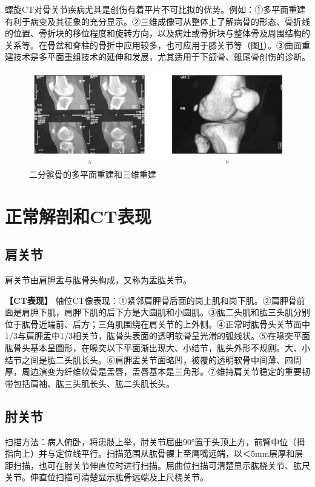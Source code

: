 螺旋CT对骨关节疾病尤其是创伤有着平片不可比拟的优势。例如：①多平面重建有利于病变及其征象的充分显示。②三维成像可从整体上了解病骨的形态、骨折线的位置、骨折块的移位程度和旋转方向，以及病灶或骨折块与整体骨及周围结构的关系等。在骨盆和脊柱的骨折中应用较多，也可应用于膝关节等（图\ref{fig22-1}）。③曲面重建技术是多平面重组技术的延伸和发展，尤其适用于下颌骨、骶尾骨创伤的诊断。

\begin{figure}[!htbp]
 \centering
 \includegraphics[width=.7\textwidth,height=\textheight,keepaspectratio]{./images/Image00417.jpg}
 \captionsetup{justification=centering}
 \caption{二分髌骨的多平面重建和三维重建}
 \label{fig22-1}
  \end{figure} 

\section{正常解剖和CT表现}

\subsection{肩关节}

肩关节由肩胛盂与肱骨头构成，又称为盂肱关节。

\textbf{【CT表现】}
轴位CT像表现：①紧邻肩胛骨后面的岗上肌和岗下肌。②肩胛骨前面是肩胛下肌，肩胛下肌的后下方是大圆肌和小圆肌。③肱二头肌和肱三头肌分别位于肱骨近端前、后方；三角肌围绕在肩关节的上外侧。④正常时肱骨头关节面中1/3与肩胛盂中1/3相关节，肱骨头表面的透明软骨呈光滑的弧线状。⑤在喙突平面肱骨头基本呈圆形，在喙突以下平面渐出现大、小结节，肱头外形不规则。大、小结节之间是肱二头肌长头。⑥肩胛盂关节面略凹，被覆的透明软骨中间薄、四周厚，周边演变为纤维软骨是盂唇，盂唇基本是三角形。⑦维持肩关节稳定的重要韧带包括肩袖、肱三头肌长头、肱二头肌长头。

\subsection{肘关节}

扫描方法：病人俯卧，将患肢上举，肘关节屈曲90°置于头顶上方，前臂中位（拇指向上）并与定位线平行。扫描范围从肱骨髁上至鹰嘴远端，以＜5mm层厚和层距扫描，也可在肘关节伸直位时进行扫描。屈曲位扫描可清楚显示肱桡关节、肱尺关节。伸直位扫描可清楚显示肱骨远端及上尺桡关节。

